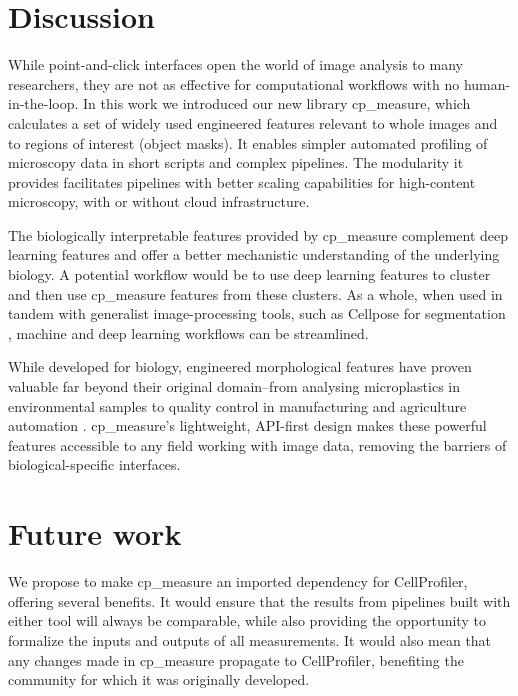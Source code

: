 \documentclass{article}
\begin{document}
\section{Discussion}
\label{sec:orgf37b369}
While point-and-click interfaces open the world of image analysis to many researchers, they are not as effective for computational workflows with no human-in-the-loop. In this work we introduced our new library cp\_measure, which calculates a set of widely used engineered features relevant to whole images and to regions of interest (object masks). It enables simpler automated profiling of microscopy data in short scripts and complex pipelines. The modularity it provides facilitates pipelines with better scaling capabilities for high-content microscopy, with or without cloud infrastructure.

The biologically interpretable features provided by cp\_measure complement deep learning features and offer a better mechanistic understanding of the underlying biology. A potential workflow would be to use deep learning features to cluster and then use cp\_measure features from these clusters. As a whole, when used in tandem with generalist image-processing tools, such as Cellpose for segmentation \cite{stringerCellposeGeneralistAlgorithm2021}, machine and deep learning workflows can be streamlined. 

While developed for biology, engineered morphological features have proven valuable far beyond their original domain--from analysing microplastics in environmental samples \citep{ideharaExploringNileRed2025} to quality control in manufacturing \citep{ilhanEffectsProcessParameters2021} and agriculture automation \citep{xuDesignNonDestructiveSeed2024}. 
cp\_measure's lightweight, API-first design makes these powerful features accessible to any field working with image data, removing the barriers of biological-specific interfaces.

\section{Future work}
\label{sec:org5cdbb12}
We propose to make cp\_measure an imported dependency for CellProfiler, offering several benefits. It would ensure that the results from pipelines built with either tool will always be comparable, while also providing the opportunity to formalize the inputs and outputs of all measurements. It would also mean that any changes made in cp\_measure propagate to CellProfiler, benefiting the community for which it was originally developed.
\end{document}
